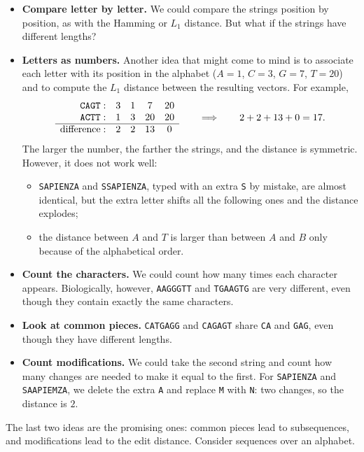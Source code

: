 \documentclass[a4paper,12pt,oneside]{report}
\begin{document}
\begin{itemize}
  \item \textbf{Compare letter by letter.} We could compare the strings
    position by position, as with the Hamming or $L_1$ distance. But
    what if the strings have different lengths?
  \item \textbf{Letters as numbers.} Another idea that might come to
    mind is to associate each letter with its position in the alphabet
    ($A=1$, $C=3$, $G=7$, $T=20$) and to compute the $L_1$ distance
    between the resulting vectors. For example,
    \[
      \begin{array}{r@{\quad}cccc}
        \texttt{CAGT}: & 3 & 1 & 7 & 20\\
        \texttt{ACTT}: & 1 & 3 & 20 & 20\\
        \hline
        \text{difference}: & 2 & 2 & 13 & 0
      \end{array}
      \qquad\Longrightarrow\qquad 2+2+13+0=17.
    \]
    The larger the number, the farther the strings, and the distance
    is symmetric. However, it does not work well:
    \begin{itemize}
      \item \texttt{SAPIENZA} and \texttt{SSAPIENZA}, typed with an
        extra \texttt{S} by mistake, are almost identical, but the
        extra letter shifts all the following ones and the distance
        explodes;
      \item the distance between $A$ and $T$ is larger than between
        $A$ and $B$ only because of the alphabetical order.
    \end{itemize}
  \item \textbf{Count the characters.} We could count how many times
    each character appears. Biologically, however, \texttt{AAGGGTT}
    and \texttt{TGAAGTG} are very different, even though they contain
    exactly the same characters.
  \item \textbf{Look at common pieces.} \texttt{CATGAGG} and
    \texttt{CAGAGT} share \texttt{CA} and \texttt{GAG}, even though
    they have different lengths.
  \item \textbf{Count modifications.} We could take the second string
    and count how many changes are needed to make it equal to the
    first. For \texttt{SAPIENZA} and \texttt{SAAPIEMZA}, we delete the
    extra \texttt{A} and replace \texttt{M} with \texttt{N}: two
    changes, so the distance is $2$.
\end{itemize}

The last two ideas are the promising ones: common pieces lead to
subsequences, and modifications lead to the edit distance. Consider
sequences over an alphabet.
\end{document}
